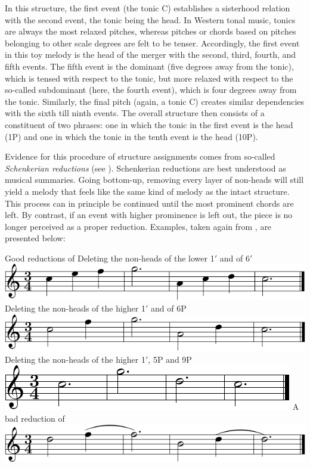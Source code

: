 \documentclass[output=paper]{langsci/langscibook}
\begin{document}
In this structure, the first event (the tonic C) establishes a sisterhood
relation with the second event, the tonic being the head. In Western tonal
music, tonics are always the most relaxed pitches, whereas pitches or chords
based on pitches belonging to other scale degrees are felt to be tenser.
Accordingly, the first event in this toy melody is the head of the merger with
the second, third, fourth, and fifth events. The fifth event is the dominant
(five degrees away from the tonic), which is tensed with respect to the tonic,
but more relaxed with respect to the so-called subdominant (here, the fourth
event), which is four degrees away from the tonic. Similarly, the final pitch
(again, a tonic C) creates similar dependencies with the sixth till ninth
events. The overall structure then consists of a constituent of two phrases:
one in which the tonic in the first event is the head (1P) and one in which the
tonic in the tenth event is the head (10P).

Evidence for this procedure of structure assignments comes from so-called
\emph{Schenkerian reductions} (see \citealt{Forte1959}). Schenkerian reductions
are best understood as musical summaries. Going bottom-up, removing every layer
of non-heads will still yield a melody that feels like the same kind of melody
as the intact structure. This process can in principle be continued until the
most prominent chords are left. By contrast, if an event with higher prominence
is left out, the piece is no longer perceived as a proper reduction. Examples,
taken again from \citet{KatzPes2011}, are presented below:\largerpage

\ea\label{ex:26.8}Good reductions of 
    \ea Deleting the non-heads of the lower 1$'$ and of 6$'$
        \includegraphics[scale=.9]{./img/28-8a.pdf}
    \ex Deleting the non-heads of the higher 1$'$ and of 6P
        \includegraphics[scale=.9]{./img/28-8b.pdf}
    \ex Deleting the non-heads of the higher 1$'$, 5P and 9P
        \includegraphics[scale=.9]{./img/28-8c.pdf}
    \z
\ex\label{ex:26.9}A bad reduction of
\\[.66\baselineskip]
    \includegraphics[scale=.9]{./img/28-9.pdf}
\z
\end{document}
